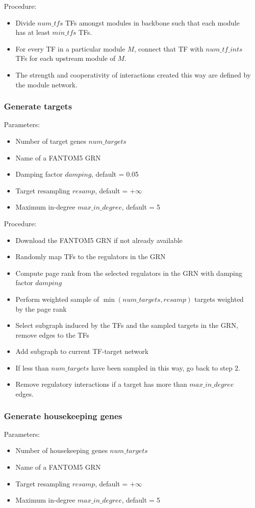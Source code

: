 Procedure: 
\begin{itemize}
	\item Divide $num\_tfs$ TFs amongst modules in backbone such that each module has at least $min\_tfs$ TFs.
	\item For every TF in a particular module $M$, connect that TF with $num\_tf\_ints$ TFs for each upstream module of $M$.
	\item The strength and cooperativity of interactions created this way are defined by the module network.
\end{itemize}

\subsubsection{Generate targets}
Parameters: 
\begin{itemize}
	\item Number of target genes $num\_targets$
	\item Name of a FANTOM5 GRN
	\item Damping factor $damping$, default = 0.05
	\item Target resampling $resamp$, default = $+\infty$
	\item Maximum in-degree $max\_in\_degree$, default = 5
\end{itemize}

Procedure:
\begin{itemize}
	\item Download the FANTOM5 GRN if not already available
	\item Randomly map TFs to the regulators in the GRN
	\item Compute page rank from the selected regulators in the GRN with damping factor $damping$
	\item Perform weighted sample of  $\min(num\_targets, resamp)$ targets weighted by the page rank
	\item Select subgraph induced by the TFs and the sampled targets in the GRN, remove edges to the TFs
	\item Add subgraph to current TF-target network
	\item If less than $num\_targets$ have been sampled in this way, go back to step 2.
	\item Remove regulatory interactions if a target has more than $max\_in\_degree$ edges.
\end{itemize}

\subsubsection{Generate housekeeping genes}
Parameters: 
\begin{itemize}
	\item Number of housekeeping genes $num\_targets$
	\item Name of a FANTOM5 GRN
	\item Target resampling $resamp$, default = $+\infty$
	\item Maximum in-degree $max\_in\_degree$, default = 5
\end{itemize}

